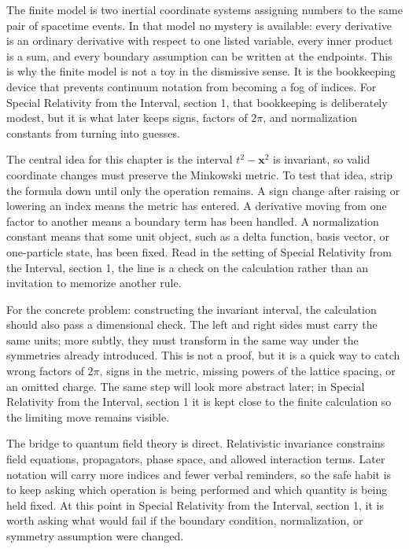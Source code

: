 The finite model is two inertial coordinate systems assigning numbers to the same pair of spacetime events.  In that model no mystery is available: every derivative is an ordinary derivative with respect to one listed variable, every inner product is a sum, and every boundary assumption can be written at the endpoints.  This is why the finite model is not a toy in the dismissive sense.  It is the bookkeeping device that prevents continuum notation from becoming a fog of indices.  For Special Relativity from the Interval, section 1, that bookkeeping is deliberately modest, but it is what later keeps signs, factors of \(2\pi\), and normalization constants from turning into guesses.

The central idea for this chapter is the interval \(t^2-\bm x^2\) is invariant, so valid coordinate changes must preserve the Minkowski metric.  To test that idea, strip the formula down until only the operation remains.  A sign change after raising or lowering an index means the metric has entered.  A derivative moving from one factor to another means a boundary term has been handled.  A normalization constant means that some unit object, such as a delta function, basis vector, or one-particle state, has been fixed.  Read in the setting of Special Relativity from the Interval, section 1, the line is a check on the calculation rather than an invitation to memorize another rule.

For the concrete problem: constructing the invariant interval, the calculation should also pass a dimensional check.  The left and right sides must carry the same units; more subtly, they must transform in the same way under the symmetries already introduced.  This is not a proof, but it is a quick way to catch wrong factors of \(2\pi\), signs in the metric, missing powers of the lattice spacing, or an omitted charge.  The same step will look more abstract later; in Special Relativity from the Interval, section 1 it is kept close to the finite calculation so the limiting move remains visible.

The bridge to quantum field theory is direct.  Relativistic invariance constrains field equations, propagators, phase space, and allowed interaction terms.  Later notation will carry more indices and fewer verbal reminders, so the safe habit is to keep asking which operation is being performed and which quantity is being held fixed.  At this point in Special Relativity from the Interval, section 1, it is worth asking what would fail if the boundary condition, normalization, or symmetry assumption were changed.

